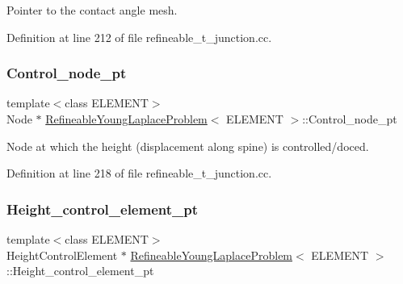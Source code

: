 Pointer to the contact angle mesh. 



Definition at line 212 of file refineable\+\_\+t\+\_\+junction.\+cc.

\mbox{\label{classRefineableYoungLaplaceProblem_af14d838e5d4a1b9df2595bb08fa5e99d}} 
\subsubsection{\texorpdfstring{Control\+\_\+node\+\_\+pt}{Control\_node\_pt}}
{\footnotesize\ttfamily template$<$class E\+L\+E\+M\+E\+NT$>$ \\
Node $\ast$ \hyperlink{classRefineableYoungLaplaceProblem}{Refineable\+Young\+Laplace\+Problem}$<$ E\+L\+E\+M\+E\+NT $>$\+::Control\+\_\+node\+\_\+pt\hspace{0.3cm}{\ttfamily [private]}}



Node at which the height (displacement along spine) is controlled/doced. 



Definition at line 218 of file refineable\+\_\+t\+\_\+junction.\+cc.

\mbox{\label{classRefineableYoungLaplaceProblem_ab97cbf6dc6490194591b03c45642e147}} 
\subsubsection{\texorpdfstring{Height\+\_\+control\+\_\+element\+\_\+pt}{Height\_control\_element\_pt}}
{\footnotesize\ttfamily template$<$class E\+L\+E\+M\+E\+NT$>$ \\
Height\+Control\+Element $\ast$ \hyperlink{classRefineableYoungLaplaceProblem}{Refineable\+Young\+Laplace\+Problem}$<$ E\+L\+E\+M\+E\+NT $>$\+::Height\+\_\+control\+\_\+element\+\_\+pt\hspace{0.3cm}{\ttfamily [private]}}



